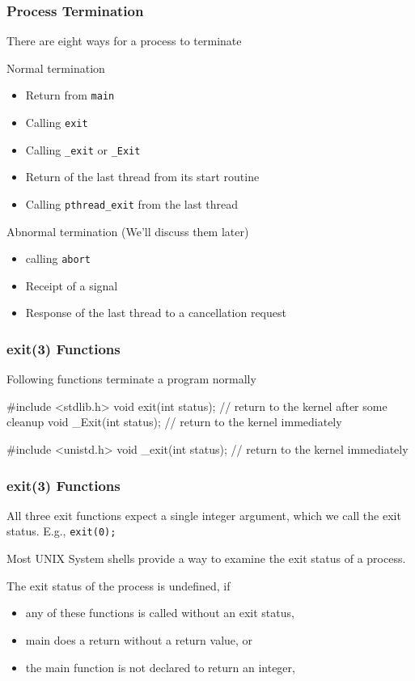 \documentclass[newPxFont,sthlmFooter,nooffset]{beamer}
\begin{document}
\begin{frame}[t]
  \frametitle{Process Termination}

There are eight ways for a process to terminate

Normal termination
\begin{itemize}
\item Return from \texttt{main}
\item Calling \texttt{exit}
\item Calling \texttt{\_exit} or \texttt{\_Exit}
\item Return of the last thread from its start routine
\item Calling \texttt{pthread\_exit} from the last thread
\end{itemize}

Abnormal termination (We'll discuss them later)
\begin{itemize}
\item calling \texttt{abort}
\item Receipt of a signal
\item Response of the last thread to a cancellation request
\end{itemize}

\end{frame}

\begin{frame}[containsverbatim,t]
  \frametitle{exit(3) Functions}
Following functions terminate a program normally
\begin{codedef}
#include <stdlib.h>
void exit(int status); // return to the kernel after some cleanup
void _Exit(int status); // return to the kernel immediately

#include <unistd.h>
void _exit(int status);  // return to the kernel immediately
\end{codedef}

\end{frame}

\begin{frame}[t]
  \frametitle{exit(3) Functions}
All three exit functions expect a single integer argument, which we
call the exit status. E.g., \texttt{exit(0);}

Most UNIX System shells provide a way to examine the exit status of a
process.

The exit status of the process is undefined, if
\begin{itemize}
\item any of these functions is called without an exit status,
\item main does a return without a return value, or
\item the main function is not declared to return an integer,
\end{itemize}

\end{frame}
\end{document}
